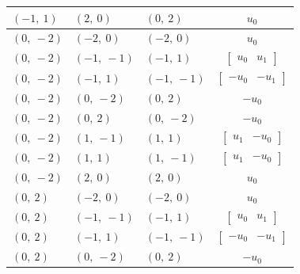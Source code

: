 \documentclass[11pt]{article}
\theoremstyle{definition}
\begin{document}
\begin{longtable}{|l|l|l|c|}
    \hline
    $\left( -1, \  1\right)$ & $\left( 2, \  0\right)$ & $\left( 0, \  2\right)$ & $u_{0}$ \\
    \hline
    $\left( 0, \  -2\right)$ & $\left( -2, \  0\right)$ & $\left( -2, \  0\right)$ & $u_{0}$ \\
    \hline
    $\left( 0, \  -2\right)$ & $\left( -1, \  -1\right)$ & $\left( -1, \  1\right)$ & $\left[\begin{matrix}u_{0} & u_{1}\end{matrix}\right]$ \\
    \hline
    $\left( 0, \  -2\right)$ & $\left( -1, \  1\right)$ & $\left( -1, \  -1\right)$ & $\left[\begin{matrix}- u_{0} & - u_{1}\end{matrix}\right]$ \\
    \hline
    $\left( 0, \  -2\right)$ & $\left( 0, \  -2\right)$ & $\left( 0, \  2\right)$ & $- u_{0}$ \\
    \hline
    $\left( 0, \  -2\right)$ & $\left( 0, \  2\right)$ & $\left( 0, \  -2\right)$ & $- u_{0}$ \\
    \hline
    $\left( 0, \  -2\right)$ & $\left( 1, \  -1\right)$ & $\left( 1, \  1\right)$ & $\left[\begin{matrix}u_{1} & - u_{0}\end{matrix}\right]$ \\
    \hline
    $\left( 0, \  -2\right)$ & $\left( 1, \  1\right)$ & $\left( 1, \  -1\right)$ & $\left[\begin{matrix}u_{1} & - u_{0}\end{matrix}\right]$ \\
    \hline
    $\left( 0, \  -2\right)$ & $\left( 2, \  0\right)$ & $\left( 2, \  0\right)$ & $u_{0}$ \\
    \hline
    $\left( 0, \  2\right)$ & $\left( -2, \  0\right)$ & $\left( -2, \  0\right)$ & $u_{0}$ \\
    \hline
    $\left( 0, \  2\right)$ & $\left( -1, \  -1\right)$ & $\left( -1, \  1\right)$ & $\left[\begin{matrix}u_{0} & u_{1}\end{matrix}\right]$ \\
    \hline
    $\left( 0, \  2\right)$ & $\left( -1, \  1\right)$ & $\left( -1, \  -1\right)$ & $\left[\begin{matrix}- u_{0} & - u_{1}\end{matrix}\right]$ \\
    \hline
    $\left( 0, \  2\right)$ & $\left( 0, \  -2\right)$ & $\left( 0, \  2\right)$ & $- u_{0}$ \\

\end{longtable}
\end{document}
